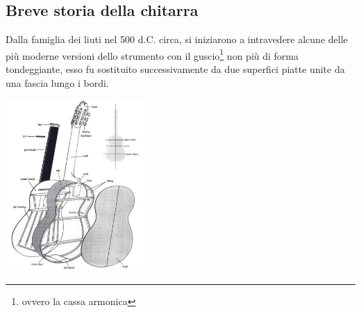 \documentclass[oneside]{article}
\begin{document}
\begin{multicols*}{2}

\section{ Breve storia della chitarra}
\hspace*{10mm}

Dalla famiglia dei liuti nel 500 d.C. circa, si iniziarono a intravedere alcune delle più moderne versioni dello strumento con il guscio\footnote{ovvero la cassa armonica} non più di forma tondeggiante, esso fu sostituito successivamente da due superfici piatte unite da una fascia lungo i bordi.

\includegraphics[width=0.4\textwidth]{img/chit_spaccato.png}


\end{multicols*}
\end{document}
